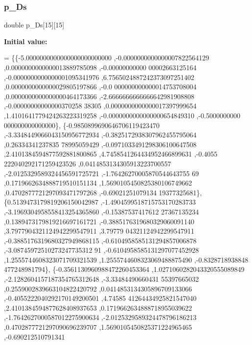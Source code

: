\mbox{\label{a00996_a0d83f56b559ca5d47e6c6667c03a1ef3}} 
\subsubsection{\texorpdfstring{p\+\_\+\+Ds}{p\_Ds}}
{\footnotesize\ttfamily double p\+\_\+\+Ds\mbox{[}15\mbox{]}\mbox{[}15\mbox{]}}

{\bfseries Initial value\+:}
\begin{DoxyCode}
= \{\{-5.0000000000000000000000000 ,-0.0000000000000007822564129 ,0.0000000000000013889785098 ,-0.00000000000
      00002663125164 ,-0.0000000000000001095341976 ,6.7565024887242373097251402 ,0.0000000000000029805197866 ,-0.0
      000000000000014753708004 ,0.0000000000000000464173366 ,-2.6666666666666642981908808 ,-0.00000000000000370258
      38305 ,0.0000000000000017397999654 ,1.4101641779424263223319258 ,-0.0000000000000000654849310 ,-0.5000000000
      000000000000000\},
\{-0.9850899690646706119423470 ,-3.3348449066043150956772934 ,-0.3825172938307962455795064 ,0.26334341237835
      78995059429 ,-0.0971033491298306100647508 ,2.4101384594877592881800865 ,4.7458541264434952466899631 ,-0.4055
      222040292171259423526 ,0.0414853134305913223700557 ,-2.0125329589324456591725721 ,-1.76426270005870544643755
      69 ,0.1719662634888719510151134 ,1.5690105450825380106749662 ,0.4702877721297093471797268 ,-0.69021251079134
      19377325681\},
\{0.5139473179819206150042987 ,-1.4904599518715753170283733 ,-3.1969304958558413254365860 ,-0.15387537417612
      27367135234 ,0.1389473179819216697161721 ,-0.3885176319680329060091140 ,3.7977904321124942299547911 ,3.79779
      04321124942299547911 ,-0.3885176319680327949868115 ,-0.6104958585131294857006878 ,-3.08745972510273247735312
      91 ,-0.6104958585131297077452928 ,1.2555744608323071709321539 ,1.2555744608323069488875490 ,-0.8328718938848
      477248981794\},
\{-0.3561130960988472260453364 ,1.0271060282043320555089849 ,-2.1282604157187354765312648 ,-3.33484490660431
      55397665032 ,0.2559002839663104822420792 ,0.0414853134305896709133066 ,-0.4055222040292170149200501 ,4.74585
      41264434925821547040 ,2.4101384594877628408937653 ,0.1719662634888718955039622 ,-1.7642627000587012275900634
       ,-2.0125329589324478796186213 ,0.4702877721297090696239707 ,1.5690105450825371224965465 ,-0.690212510791341

\end{DoxyCode}
